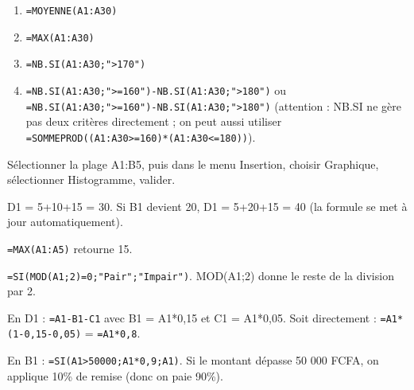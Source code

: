 \begin{enumerate}
    \item \texttt{=MOYENNE(A1:A30)}
    \item \texttt{=MAX(A1:A30)}
    \item \texttt{=NB.SI(A1:A30;">170")}
    \item \texttt{=NB.SI(A1:A30;">=160")-NB.SI(A1:A30;">180")} ou \texttt{=NB.SI(A1:A30;">=160")-NB.SI(A1:A30;">180")} (attention : NB.SI ne gère pas deux critères directement ; on peut aussi utiliser \texttt{=SOMMEPROD((A1:A30>=160)*(A1:A30<=180))}).
\end{enumerate}

Sélectionner la plage A1:B5, puis dans le menu Insertion, choisir Graphique, sélectionner Histogramme, valider.

D1 = 5+10+15 = 30. Si B1 devient 20, D1 = 5+20+15 = 40 (la formule se met à jour automatiquement).

\texttt{=MAX(A1:A5)} retourne 15.

\texttt{=SI(MOD(A1;2)=0;"Pair";"Impair")}. MOD(A1;2) donne le reste de la division par 2.

En D1 : \texttt{=A1-B1-C1} avec B1 = A1*0,15 et C1 = A1*0,05. Soit directement : \texttt{=A1*(1-0,15-0,05)} = \texttt{=A1*0,8}.

En B1 : \texttt{=SI(A1>50000;A1*0,9;A1)}. Si le montant dépasse 50 000 FCFA, on applique 10\% de remise (donc on paie 90\%).